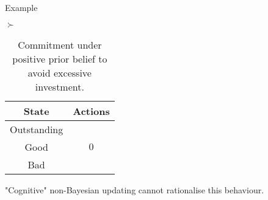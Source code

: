 \documentclass[usenames,dvipsnames,aspectratio=169,11pt, envcountsect, handout]{beamer}
\begin{document}
\begin{frame}{Example}
\begin{table}[H]
		\( \succ \) %
		\begin{minipage}{0.29\textwidth}
			\centering
			\begin{tabular}{c | c}
				State       & Actions                   \\
				\hline
				Outstanding & \multirow{3}{*}{ \( 0 \)} \\
				Good        &                           \\
				Bad         &                           \\
			\end{tabular}
			\vspace{0.5cm} %
		\end{minipage}
		\caption{Commitment under positive prior belief to avoid excessive investment.} %
		\label{tab:commitment}
	\end{table}

	\vfill

	"Cognitive" non-Bayesian updating \citep{epsteinAxiomaticModelNonBayesian2006} cannot rationalise this behaviour.

\end{frame}
\end{document}
